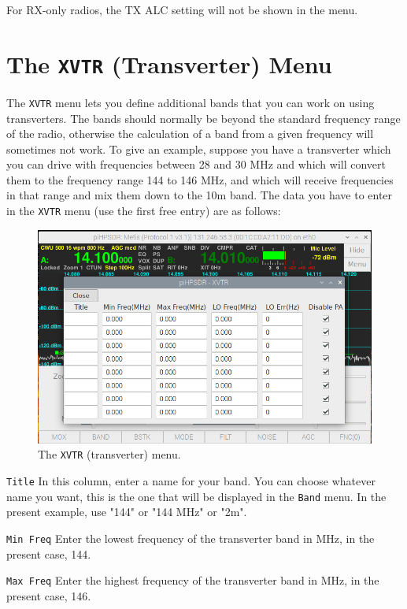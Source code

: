\documentclass[12pt]{book}
\def\rett#1{\texttt{\color{red}#1}}
\def\bltt#1{\texttt{\color{blue}#1}}
\begin{document}
For RX-only radios, the TX ALC setting will not be shown in the menu.

\section{The \texttt{XVTR} (Transverter) Menu}

The \bltt{XVTR} menu lets you define additional bands
that you can work on using transverters. The bands
should normally be beyond the standard frequency range of
the radio, otherwise the calculation of a band from
a given frequency will sometimes not work. To give an example,
suppose you have a transverter which you can drive with frequencies
between 28 and 30 MHz and which will convert them to the frequency
range 144 to 146 MHz, and which will receive frequencies in that
range and mix them down to the 10m band. The data you have to enter
in the \bltt{XVTR} menu (use the first free entry) are as follows:
\begin{figure}[ht]
\center
\includegraphics[width=12cm]{XVTRMenu.png}
\caption{The \bltt{XVTR} (transverter) menu.}
\label{fig:XVTRMenu}
\end{figure}



\rett{Title} In this column, enter a name for your band. You can choose
whatever name you want, this is the one that will be displayed in the
\bltt{Band} menu. In the present example, use "144" or "144 MHz" or "2m".

\rett{Min Freq} Enter the lowest frequency of the transverter band in MHz,
in the present case, 144.

\rett{Max Freq} Enter the highest frequency of the transverter band in MHz,
in the present case, 146.
\end{document}
